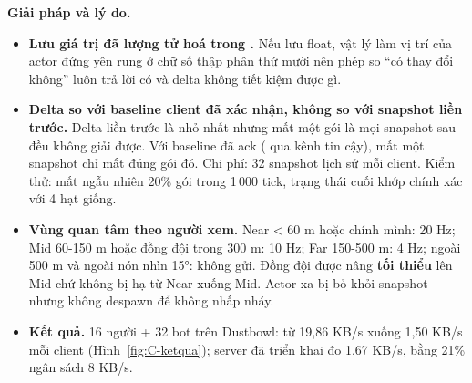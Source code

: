 \textbf{Giải pháp và lý do.}
\begin{itemize}
  \item \textbf{Lưu giá trị đã lượng tử hoá trong .} Nếu lưu float, vật lý làm vị trí của actor đứng yên
        rung ở chữ số thập phân thứ mười nên phép so ``có thay đổi không'' luôn trả lời có và delta không tiết kiệm được gì.
  \item \textbf{Delta so với baseline client đã xác nhận, không so với snapshot liền trước.} Delta liền trước là nhỏ nhất nhưng
        mất một gói là mọi snapshot sau đều không giải được. Với baseline đã ack ( qua kênh tin cậy),
        mất một snapshot chỉ mất đúng gói đó. Chi phí: 32 snapshot lịch sử mỗi client. Kiểm thử: mất ngẫu nhiên 20\%
        gói trong 1\,000 tick, trạng thái cuối khớp chính xác với 4 hạt giống.
  \item \textbf{Vùng quan tâm theo người xem.} Near < 60 m hoặc chính mình: 20 Hz; Mid 60-150 m hoặc đồng đội trong 300 m:
        10 Hz; Far 150-500 m: 4 Hz; ngoài 500 m và ngoài nón nhìn 15°: không gửi. Đồng đội được nâng \textbf{tối thiểu}
        lên Mid chứ không bị hạ từ Near xuống Mid. Actor xa bị bỏ khỏi snapshot nhưng không despawn để không nhấp nháy.
  \item \textbf{Kết quả.} 16 người + 32 bot trên Dustbowl: từ 19,86 KB/s xuống 1,50 KB/s mỗi client (Hình~\ref{fig:C-ketqua});
        server đã triển khai đo 1,67 KB/s, bằng 21\% ngân sách 8 KB/s.
\end{itemize}

